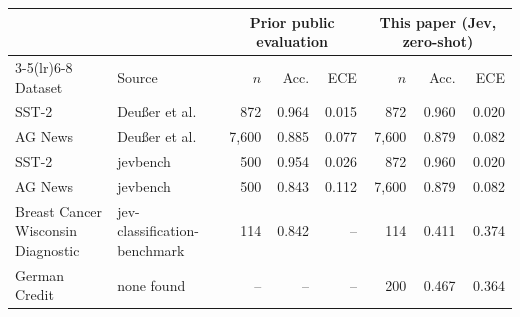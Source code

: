 \begin{tabular}{llrrrrrr}
\toprule
 & & \multicolumn{3}{c}{Prior public evaluation} & \multicolumn{3}{c}{This paper (Jev, zero-shot)} \\
\cmidrule(lr){3-5}\cmidrule(lr){6-8}
Dataset & Source & $n$ & Acc. & ECE & $n$ & Acc. & ECE \\
\midrule
SST-2 & Deußer et al.~\citep{deusser2026jev} & 872 & 0.964 & 0.015 & 872 & 0.960 & 0.020 \\
AG News & Deußer et al.~\citep{deusser2026jev} & 7{,}600 & 0.885 & 0.077 & 7{,}600 & 0.879 & 0.082 \\
SST-2 & jevbench~\citep{jevbench2026} & 500 & 0.954 & 0.026 & 872 & 0.960 & 0.020 \\
AG News & jevbench~\citep{jevbench2026} & 500 & 0.843 & 0.112 & 7{,}600 & 0.879 & 0.082 \\
Breast Cancer Wisconsin Diagnostic & jev-classification-benchmark~\citep{statsguysam2026} & 114 & 0.842 & -- & 114 & 0.411 & 0.374 \\
German Credit & none found & -- & -- & -- & 200 & 0.467 & 0.364 \\
\bottomrule
\end{tabular}
